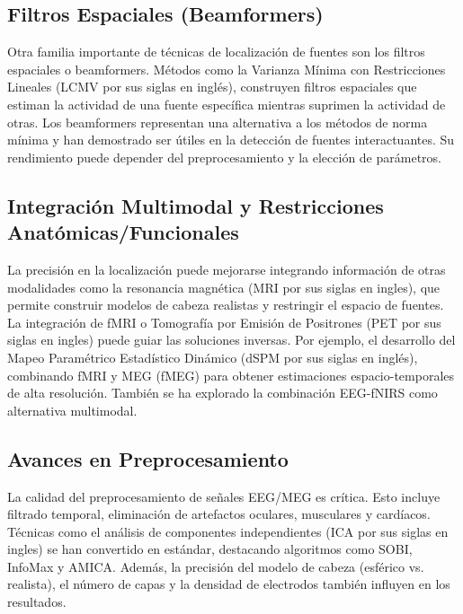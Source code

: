 \subsection{Filtros Espaciales (Beamformers)}

Otra familia importante de técnicas de localización de fuentes son los filtros espaciales o beamformers\cite{Zhang2023EEGReview}. Métodos como la Varianza Mínima con Restricciones Lineales (LCMV por sus siglas en inglés)\cite{Sun2022DeepNN}, construyen filtros espaciales que estiman la actividad de una fuente específica mientras suprimen la actividad de otras. Los beamformers representan una alternativa a los métodos de norma mínima\cite{Hincapie2016} y han demostrado ser útiles en la detección de fuentes interactuantes. Su rendimiento puede depender del preprocesamiento y la elección de parámetros\cite{Asadzadeh2020}.

\subsection{Integración Multimodal y Restricciones Anatómicas/Funcionales}

La precisión en la localización puede mejorarse integrando información de otras modalidades como la resonancia magnética (MRI por sus siglas en ingles), que permite construir modelos de cabeza realistas y restringir el espacio de fuentes\cite{Dale2000}. La integración de fMRI o Tomografía por Emisión de Positrones (PET por sus siglas en ingles) puede guiar las soluciones inversas. Por ejemplo, el desarrollo del Mapeo Paramétrico Estadístico Dinámico (dSPM por sus siglas en inglés), combinando fMRI y MEG (fMEG) para obtener estimaciones espacio-temporales de alta resolución. También se ha explorado la combinación EEG-fNIRS como alternativa multimodal\cite{Li2022}.

\subsection{Avances en Preprocesamiento}

La calidad del preprocesamiento de señales EEG/MEG es crítica. Esto incluye filtrado temporal, eliminación de artefactos oculares, musculares y cardíacos\cite{Uriguen2015}. Técnicas como el análisis de componentes independientes (ICA por sus siglas en ingles) se han convertido en estándar, destacando algoritmos como SOBI\cite{belouchrani1997sobi}, InfoMax\cite{bell1995infomax} y AMICA\cite{palmer2008amica}. Además, la precisión del modelo de cabeza (esférico vs. realista), el número de capas y la densidad de electrodos también influyen en los resultados\cite{Michel2019}.

